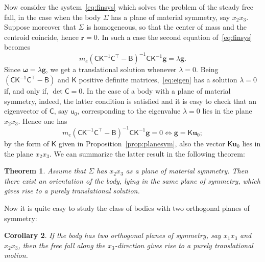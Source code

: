 \documentclass[final]{amsart}
\newtheorem{thm}{Theorem}[section]
\newtheorem{cor}[thm]{Corollary}
\theoremstyle{definition}
\theoremstyle{definition}
\theoremstyle{remark}
\begin{document}
Now consider the system~\eqref{eq:finsys} which solves the problem of
the steady free fall, in the case when the body $\Sigma$ has a
plane of material symmetry, say $x_2x_3$. Suppose moreover that
$\Sigma$ is homogeneous, so that the center of mass and the centroid
coincide, hence ${\boldsymbol r}=0$. In such a case the second equation of~\eqref{eq:finsys}
becomes
\begin{equation}
\label{eq:eigen}
m_e({\mathsf C}{\mathsf K}^{-1}{\mathsf C}^{\intercal}-{\mathsf B})^{-1}{\mathsf C}{\mathsf K}^{-1}{\boldsymbol g}=\lambda{\boldsymbol g}.
\end{equation}
Since ${\boldsymbol \omega}=\lambda {\boldsymbol g}$, we get a translational
solution whenever $\lambda=0$. Being $({\mathsf C}{\mathsf K}^{-1}{\mathsf C}^{\intercal}-{\mathsf B})$
and ${\mathsf K}$ positive definite matrices,~\eqref{eq:eigen} has a
solution $\lambda=0$ if, and only if, $\det {\mathsf C}=0$. In the case of a
body with a plane of material symmetry, indeed, the latter condition
is satisfied and it is easy to check that an eigenvector of ${\mathsf C}$,
say ${\mathsf u}_0$, corresponding to the eigenvalue $\lambda=0$ lies in the
plane $x_2x_3$. Hence one has
\[
m_e({\mathsf C}{\mathsf K}^{-1}{\mathsf C}^{\intercal}-{\mathsf B})^{-1}{\mathsf C}{\mathsf K}^{-1}{\boldsymbol g}=0
\iff
{\boldsymbol g}={\mathsf K}{\boldsymbol u}_0;
\]
by the form of ${\mathsf K}$ given in Proposition~\ref{prop:planesym}, also the
vector ${\mathsf K} {\boldsymbol u}_0$ lies in the plane $x_2x_3$. We can summarize
the latter result in the following theorem:
\begin{thm}
Assume that ${\Sigma}$ has $x_2x_3$ as a plane of material symmetry. Then
there exist an orientation of the body, lying in the same plane of
symmetry, which gives rise to a purely translational solution.
\end{thm}

Now it is quite easy to study the class of bodies with two orthogonal
planes of symmetry:
\begin{cor}
If the body has two orthogonal planes of symmetry, say $x_1x_3$ and
$x_2x_3$, then the free fall along the $x_3$-direction gives rise to a
 purely translational motion.
\end{cor}
\end{document}
